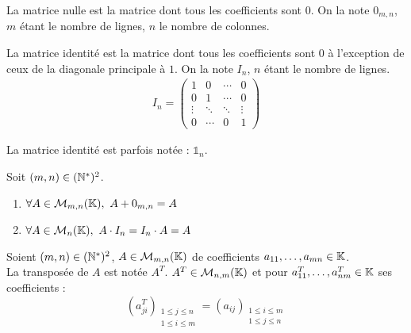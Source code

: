 \begin{definition}
	La matrice nulle est la matrice dont tous les coefficients sont $0$. On la note $0_{m,n}$, $m$ étant le nombre de lignes, $n$ le nombre de colonnes. 
\end{definition}

\begin{definition}
	La matrice identité est la matrice dont tous les coefficients sont $0$ à l'exception de ceux de la diagonale principale à $1$. On la note $I_n$, $n$ étant le nombre de lignes.
	\begin{align*}
		I_n = 
		\begin{pmatrix}
			1 & 0 & \cdots & 0 \\
			0 & 1 & \cdots & 0 \\
			\vdots & \ddots & \ddots & \vdots \\
			0 & \cdots & 0 & 1
		\end{pmatrix}
	\end{align*}
\end{definition}

\begin{remark}
    La matrice identité est parfois notée : $\mathds{1}_n$.
\end{remark}

\begin{lemma}
	Soit $(m,n) \in (\mathbb{N}^*)^2$.
	\begin{multicols}{2}
	    \begin{enumerate}
    		\item $\forall A \in \mathcal{M}_{m, n}(\K),\ A + 0_{m,n} = A$
    		\item $\forall A \in \mathcal{M}_{n}(\mathbb{K}),\ A \cdot I_n = I_n \cdot A = A$
    	\end{enumerate}
	\end{multicols}
\end{lemma}

\begin{definition}[Transposée]
	Soient $(m,n) \in (\mathbb{N}^*)^2$, $A \in \mathcal{M}_{m, n}(\mathbb{K})$ de coefficients $a_{11}, \ldots, a_{mn} \in \mathbb{K}$.
	\\
	La transposée de $A$ est notée $A^T$. $A^T \in \mathcal{M}_{n,m}(\mathbb{K})$ et pour $a^T_{11}, \ldots, a^T_{nm} \in \mathbb{K}$ ses coefficients :
	\[ (a^T_{ji})_{\substack{1 \leq j \leq n \\ 1 \leq i \leq m}} = (a_{ij})_{\substack{1 \leq i \leq m \\ 1 \leq j \leq n}} \]
\end{definition}

